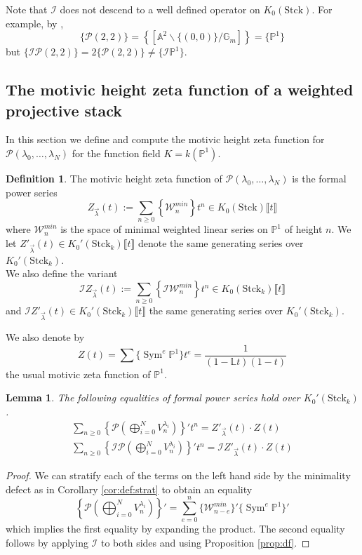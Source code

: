 \documentclass[a4paper,12pt]{amsart}
\newtheorem{lem}[thm]{Lemma}
\theoremstyle{definition}
\newtheorem{defn}[thm]{Definition}
\newcommand{\bP}{\mathbb{P}}
\newcommand{\cW}{\mathcal{W}}
\newcommand{\cP}{\mathcal{P}}
\newcommand{\cI}{\mathcal{I}}
\newcommand{\Pc}{\mathcal{P}}
\newcommand{\Lb}{\mathbb{L}}
\DeclareMathOperator{\Sym}{Sym}
\renewcommand{\setminus}{\smallsetminus}
\begin{document}
	Note that $\cI$ does not descend to a well defined operator on $K_0(\mathrm{Stck})$. For example, by \cite[Prop. 1.1 iii)]{Ekedahl},
	$$
	\{\cP(2,2)\} = \left\{ \left[\mathbb{A}^2 \setminus \{(0,0)\}/\mathbb{G}_m\right] \right\} = \{\bP^1\}
	$$
	but $\{\cI \cP(2,2)\} = 2\{\cP(2,2)\} \neq \{\cI\bP^1\}$. 
	
	\subsection{The motivic height zeta function of a weighted projective stack}\label{sec:zeta}
	
	In this section we define and compute the motivic height zeta function for $\cP(\lambda_0, \ldots, \lambda_N)$ for the function field $K = k(\bP^1)$. 
	
	\begin{defn}
		The motivic height zeta function of $\cP(\lambda_0, \ldots, \lambda_N)$ is the formal power series
		$$
		Z_{\vec{\lambda}}(t) := \sum_{n \geq 0} \left\{\cW_n^{min}\right\}t^n \in K_0(\mathrm{Stck})\llbracket t \rrbracket
		$$
		where $\cW_n^{min}$ is the space of minimal weighted linear series on $\bP^1$ of height $n$. We let $Z'_{\vec{\lambda}}(t) \in K_0'(\mathrm{Stck}_k)\llbracket t \rrbracket$ denote the same generating series over $K_0'(\mathrm{Stck}_k)$. \\
		
		\noindent We also define the variant
		$$
		\cI Z_{\vec{\lambda}}(t) := \sum_{n \geq 0} \left\{\cI\cW_n^{min}\right\}t^n \in K_0(\mathrm{Stck}_k)\llbracket t \rrbracket
		$$
		and $\cI Z'_{\vec{\lambda}}(t) \in K_0'(\mathrm{Stck}_k)\llbracket t \rrbracket$ the same generating series over $K_0'(\mathrm{Stck}_k)$. 
	\end{defn}
	
	We also denote by 
	$$
	Z(t) = \sum \{\Sym^e\bP^1\}t^e = \frac{1}{(1-\Lb t)(1-t)}
	$$
	the usual motivic zeta function of $\bP^1$. 
	
	\begin{lem}\label{lem:wps}
		The following equalities of formal power series hold over $K_0'(\mathrm{Stck}_k)$. 
		\begin{align}
			\sum_{n \ge 0} \left\{\Pc \left(\bigoplus_{i = 0}^N V_{n}^{\lambda_i} \right) \right\}' t^n = Z'_{\vec{\lambda}}(t) \cdot Z(t) \label{eqn:wps}\\
			\sum_{n \ge 0} \left\{\cI\Pc \left(\bigoplus_{i = 0}^N V_{n}^{\lambda_i} \right) \right\}' t^n = \cI Z'_{\vec{\lambda}}(t) \cdot Z(t) \label{eqn:iwps}
		\end{align}
	\end{lem}
	\begin{proof} 
		We can stratify each of the terms on the left hand side by the minimality defect as in Corollary \ref{cor:def:strat} to obtain an equality
		$$
		\left\{\Pc \left(\bigoplus_{i = 0}^N V_{n}^{\lambda_i} \right) \right\}' = \sum_{e = 0}^n \{\cW_{n-e}^{min}\}' \{\Sym^e\bP^1\}'
		$$
		which implies the first equality by expanding the product. The second equality follows by applying $\cI$ to both sides and using Proposition \ref{prop:df}. 
	\end{proof} 
	
\end{document}
